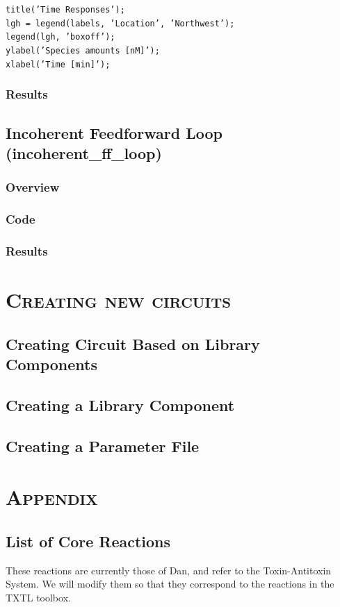 \documentclass[english]{report}
\begin{document}
\noindent \texttt{title('Time Responses');}\\
\texttt{lgh = legend(labels, 'Location', 'Northwest');}\\
\texttt{legend(lgh, 'boxoff');}\\
\texttt{ylabel('Species amounts [nM]');}\\
\texttt{xlabel('Time [min]');}

		
		
		\subsection{Results}	
	\section{Incoherent Feedforward Loop (incoherent\_ff\_loop)}
		\subsection{Overview}
		\subsection{Code}
		\subsection{Results}	

\chapter{\textsc{Creating new circuits}}
	\section{Creating Circuit Based on Library Components}
	
	\section{Creating a Library Component}
	\section{Creating a Parameter File}


\chapter{\textsc{Appendix}}
	\section{List of Core Reactions}
	These reactions are currently those of Dan, and refer to the Toxin-Antitoxin System. We will modify them so that they correspond to the reactions in the TXTL toolbox. 
\end{document}

